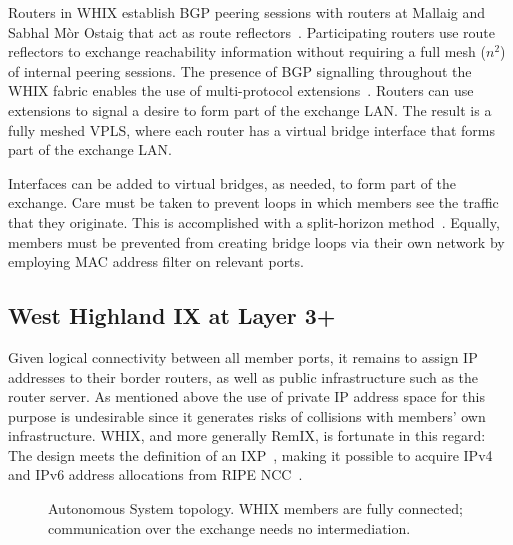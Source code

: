 Routers in \ac{WHIX} establish \acs{BGP} peering sessions with routers at
Mallaig and Sabhal M\`{o}r Ostaig that act as route reflectors~\cite{rfc4456}.
Participating routers use route reflectors to exchange reachability information
without requiring a full mesh ($n^2$) of internal peering sessions. The presence
of \acs{BGP} signalling throughout the \ac{WHIX} fabric enables the use of
multi-protocol extensions~\cite{rfc4760}. Routers can use extensions to signal a
desire to form part of the exchange \acs{LAN}.
The result is a fully meshed \acs{VPLS}, where each router has a virtual bridge
interface that forms part of the exchange \acs{LAN}.

Interfaces can be added to virtual bridges, as needed, to
form part of the exchange. Care must be taken to prevent loops in which members
see the traffic that they originate. This is accomplished with a split-horizon
method~\cite{rfc4762}. Equally, members must be prevented from creating bridge
loops via their own network by employing \acs{MAC} address filter on relevant
ports.

\subsection{West Highland IX at Layer 3+}

Given logical connectivity between all member ports, it remains to
assign IP addresses to their border routers, as well as public
infrastructure such as the router server. As mentioned above the use
of private IP address space for this purpose is undesirable since it
generates risks of collisions with members' own infrastructure.
\ac{WHIX}, and more generally RemIX, is fortunate in this regard: The
design meets the definition of an \ac{IXP}~\cite{ripe451,whixrules},
making it possible to acquire IPv4 and IPv6 address allocations from
RIPE NCC~\cite{ripe649}.

\begin{figure}[h]
  \resizebox{1.0\linewidth}{!}{
    \begin{tikzpicture}
      \whixtopodiagram
    \end{tikzpicture}
  }
  \caption{
  Autonomous System topology. WHIX members are fully
  connected; communication over the
  exchange needs no intermediation.
  }
  \label{fig:l3}
\end{figure}

